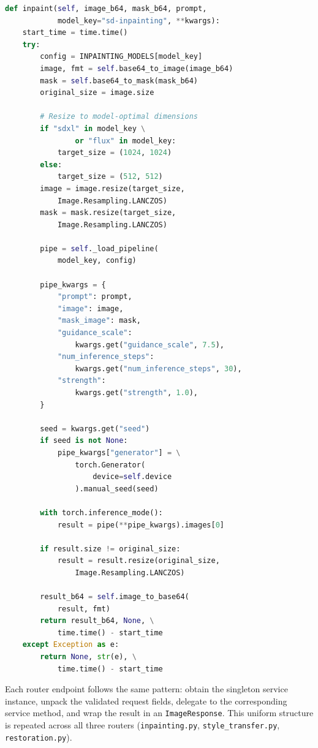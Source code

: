 \documentclass[12pt,a4paper]{report}
\begin{document}
\begin{lstlisting}[language=Python, caption={Inpainting inference method (\texttt{diffusion.py})}, label={lst:inpaint_method}]
def inpaint(self, image_b64, mask_b64, prompt,
            model_key="sd-inpainting", **kwargs):
    start_time = time.time()
    try:
        config = INPAINTING_MODELS[model_key]
        image, fmt = self.base64_to_image(image_b64)
        mask = self.base64_to_mask(mask_b64)
        original_size = image.size

        # Resize to model-optimal dimensions
        if "sdxl" in model_key \
                or "flux" in model_key:
            target_size = (1024, 1024)
        else:
            target_size = (512, 512)
        image = image.resize(target_size,
            Image.Resampling.LANCZOS)
        mask = mask.resize(target_size,
            Image.Resampling.LANCZOS)

        pipe = self._load_pipeline(
            model_key, config)

        pipe_kwargs = {
            "prompt": prompt,
            "image": image,
            "mask_image": mask,
            "guidance_scale":
                kwargs.get("guidance_scale", 7.5),
            "num_inference_steps":
                kwargs.get("num_inference_steps", 30),
            "strength":
                kwargs.get("strength", 1.0),
        }

        seed = kwargs.get("seed")
        if seed is not None:
            pipe_kwargs["generator"] = \
                torch.Generator(
                    device=self.device
                ).manual_seed(seed)

        with torch.inference_mode():
            result = pipe(**pipe_kwargs).images[0]

        if result.size != original_size:
            result = result.resize(original_size,
                Image.Resampling.LANCZOS)

        result_b64 = self.image_to_base64(
            result, fmt)
        return result_b64, None, \
            time.time() - start_time
    except Exception as e:
        return None, str(e), \
            time.time() - start_time
\end{lstlisting}

Each router endpoint follows the same pattern: obtain the singleton service instance, unpack the validated request fields, delegate to the corresponding service method, and wrap the result in an \texttt{ImageResponse}. This uniform structure is repeated across all three routers (\texttt{inpainting.py}, \texttt{style\_transfer.py}, \texttt{restoration.py}).
\end{document}
